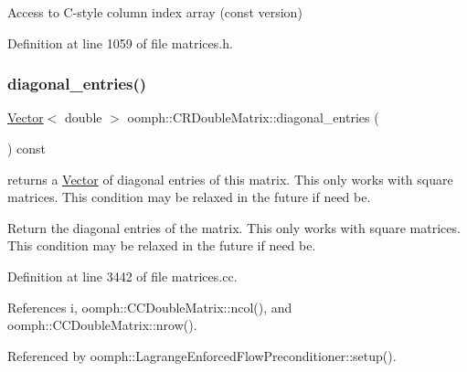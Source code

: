 Access to C-\/style column index array (const version) 



Definition at line 1059 of file matrices.\+h.

\mbox{\label{classoomph_1_1CRDoubleMatrix_ad438e693468cd0ae179460eafcaab038}} 
\subsubsection{\texorpdfstring{diagonal\+\_\+entries()}{diagonal\_entries()}}
{\footnotesize\ttfamily \hyperlink{classoomph_1_1Vector}{Vector}$<$ double $>$ oomph\+::\+C\+R\+Double\+Matrix\+::diagonal\+\_\+entries (\begin{DoxyParamCaption}{ }\end{DoxyParamCaption}) const}



returns a \hyperlink{classoomph_1_1Vector}{Vector} of diagonal entries of this matrix. This only works with square matrices. This condition may be relaxed in the future if need be. 

Return the diagonal entries of the matrix. This only works with square matrices. This condition may be relaxed in the future if need be. 

Definition at line 3442 of file matrices.\+cc.



References i, oomph\+::\+C\+C\+Double\+Matrix\+::ncol(), and oomph\+::\+C\+C\+Double\+Matrix\+::nrow().



Referenced by oomph\+::\+Lagrange\+Enforced\+Flow\+Preconditioner\+::setup().

\mbox{\label{classoomph_1_1CRDoubleMatrix_a311cf35d030c6cc22b389c2542a4089c}} 

